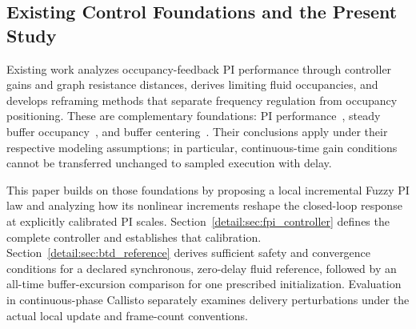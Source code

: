 \subsection{Existing Control Foundations and the Present Study}

Existing work analyzes occupancy-feedback PI performance through controller gains and graph resistance distances, derives limiting fluid occupancies, and develops reframing methods that separate frequency regulation from occupancy positioning. These are complementary foundations: PI performance~\cite{lall2022resistance}, steady buffer occupancy~\cite{lall2024bufferOccupancy}, and buffer centering~\cite{lall2023bufferCentering}. Their conclusions apply under their respective modeling assumptions; in particular, continuous-time gain conditions cannot be transferred unchanged to sampled execution with delay.

This paper builds on those foundations by proposing a local incremental Fuzzy PI law and analyzing how its nonlinear increments reshape the closed-loop response at explicitly calibrated PI scales. Section~\ref{detail:sec:fpi_controller} defines the complete controller and establishes that calibration. Section~\ref{detail:sec:btd_reference} derives sufficient safety and convergence conditions for a declared synchronous, zero-delay fluid reference, followed by an all-time buffer-excursion comparison for one prescribed initialization. Evaluation in continuous-phase Callisto separately examines delivery perturbations under the actual local update and frame-count conventions.

